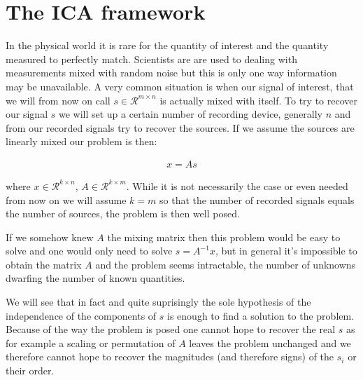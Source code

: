 \documentclass[a4paper,BCOR=5mm,oneside,openany]{scrreprt}
\begin{document}


\chapter{The ICA framework}

In the physical world it is rare for the quantity of interest and the quantity measured to perfectly match. Scientists are are used to dealing with measurements mixed with random noise but this is only one way information may be unavailable.
A very common situation is when our signal of interest, that we will from now on call $s \in \mathcal{R}^{m \times n}$ is actually mixed with itself. To try to recover our signal $s$ we will set up a certain number of recording device, generally $n$ and from our recorded signals try to recover the sources. If we assume the sources are linearly mixed our problem is then:

\begin{align*}
	x = A s
\end{align*}

where $x \in \mathcal{R}^{k \times n}$, $A \in \mathcal{R}^{k \times m}$. While it is not necessarily the case or even needed from now on we will assume $k = m$ so that the number of recorded signals equals the number of sources, the problem is then well posed.

If we somehow knew $A$ the mixing matrix then this problem would be easy to solve and one would only need to solve $s = A^{-1} x$, but in general it's impossible to obtain the matrix $A$ and the problem seems intractable, the number of unknowns dwarfing the number of known quantities.

We will see that in fact and quite suprisingly the sole hypothesis of the independence of the components of $s$ is enough to find a solution to the problem. Because of the way the problem is posed one cannot hope to recover the real $s$ as for example a scaling or permutation of $A$ leaves the problem unchanged and we therefore cannot hope to recover the magnitudes (and therefore signs) of the $s_i$ or their order.

\tableofcontents

\listoftodos

\printbibliography
\end{document}
